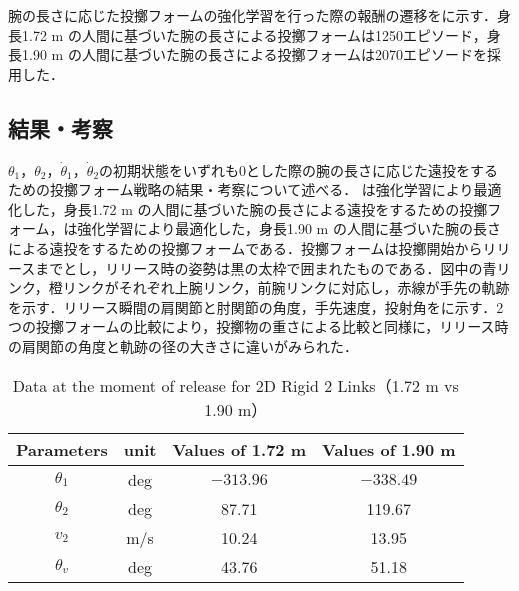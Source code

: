 腕の長さに応じた投擲フォームの強化学習を行った際の報酬の遷移をに示す．身長1.72 m の人間に基づいた腕の長さによる投擲フォームは1250エピソード，身長1.90 m の人間に基づいた腕の長さによる投擲フォームは2070エピソードを採用した．


\subsection{結果・考察}
$\theta_{1}$，$\theta_{2}$，$\dot{\theta}_{1}$，$\dot{\theta}_{2}$の初期状態をいずれも0とした際の腕の長さに応じた遠投をするための投擲フォーム戦略の結果・考察について述べる．
は強化学習により最適化した，身長1.72 m の人間に基づいた腕の長さによる遠投をするための投擲フォーム，は強化学習により最適化した，身長1.90 m の人間に基づいた腕の長さによる遠投をするための投擲フォームである．投擲フォームは投擲開始からリリースまでとし，リリース時の姿勢は黒の太枠で囲まれたものである．図中の青リンク，橙リンクがそれぞれ上腕リンク，前腕リンクに対応し，赤線が手先の軌跡を示す．リリース瞬間の肩関節と肘関節の角度，手先速度，投射角をに示す．2つの投擲フォームの比較により，投擲物の重さによる比較と同様に，リリース時の肩関節の角度と軌跡の径の大きさに違いがみられた．

\begin{table}[tb]
  \begin{center}
    \caption{Data at the moment of release for 2D Rigid 2 Links（1.72 m vs 1.90 m）}
    \begin{tabular}{c|c|c|c}
      \hline
      Parameters & unit & Values of 1.72 m & Values of 1.90 m \\
      \hline
      $\theta_{1}$ & deg & $-313.96$ & $-338.49$ \\
      $\theta_{2}$ & deg & 87.71 & 119.67 \\
      $v_{2}$ & m/s & 10.24 & 13.95 \\
      $\theta_{v}$ & deg & 43.76 & 51.18 \\
      \hline
    \end{tabular}
  \end{center}
\end{table}

